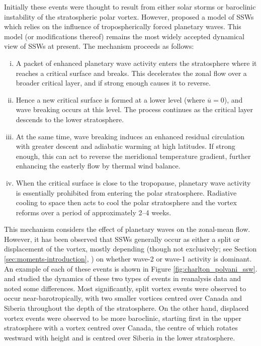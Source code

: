 Initially these events were thought to result from either solar storms or
baroclinic instability of the stratospheric polar vortex. However,
\citet{Matsuno1970, Matsuno1971} proposed a model of SSWs which relies on the
influence of tropospherically forced planetary waves. This model (or
modifications thereof) remains the most widely accepted dynamical view of SSWs
at present. The mechanism proceeds as follows:
\begin{enumerate}[i.]
\item A packet of enhanced planetary wave activity enters the stratosphere where
  it reaches a critical surface and breaks. This decelerates the zonal flow over
  a broader critical layer, and if strong enough causes it to reverse.
\item Hence a new critical surface is formed at a lower level (where
  $\overline{u}=0$), and wave breaking occurs at this level. The process
  continues as the critical layer descends to the lower stratosphere.
\item At the same time, wave breaking induces an enhanced residual circulation
  with greater descent and adiabatic warming at high latitudes. If strong
  enough, this can act to reverse the meridional temperature gradient, further
  enhancing the easterly flow by thermal wind balance. 
\item When the critical surface is close to the tropopause, planetary wave
  activity is essentially prohibited from entering the polar
  stratosphere. Radiative cooling to space then acts to cool the polar
  stratosphere and the vortex reforms over a period of approximately 2--4 weeks.
\end{enumerate}

This mechanism considers the effect of planetary waves on the zonal-mean
flow. However, it has been observed that SSWs generally occur as either a split
or displacement of the vortex, mostly depending (though not exclusively; see
Section \ref{sec:moments-introduction}, \citep{Waugh1997}) on whether wave-2 or
wave-1 activity is dominant. An example of each of these events is shown in
Figure \ref{fig:charlton_polvani_ssw}. \citet{Charlton2007} and
\citet{Matthewman2009} studied the dynamics of these two types of events in
reanalysis data and noted some differences. Most significantly, split vortex
events were observed to occur near-barotropically, with two smaller vortices
centred over Canada and Siberia throughout the depth of the stratosphere. On the
other hand, displaced vortex events were observed to be more baroclinic,
starting first in the upper stratosphere with a vortex centred over Canada, the
centre of which rotates westward with height and is centred over Siberia in the
lower stratosphere.


